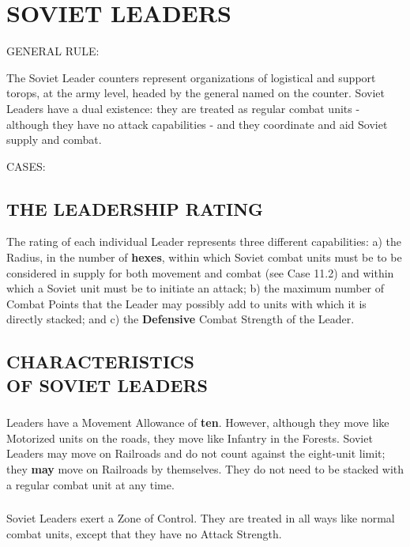\section{SOVIET LEADERS}

GENERAL RULE:

The Soviet Leader counters represent organizations of logistical and support torops, at the army level, headed by the general named on the counter. Soviet Leaders have a dual existence: they are treated as regular combat units - although they have no attack capabilities - and they coordinate and aid Soviet supply and combat.

CASES:

\subsection{THE LEADERSHIP RATING}

The rating of each individual Leader represents three different capabilities: a) the Radius, in the number of \textbf{hexes}, within which Soviet combat units must be to be considered in supply for both movement and combat (see Case 11.2) and within which a Soviet unit must be to initiate an attack; b) the maximum number of Combat Points that the Leader may possibly add to units with which it is directly stacked; and c) the \textbf{Defensive} Combat Strength of the Leader.

\subsection{CHARACTERISTICS\\OF SOVIET LEADERS}

\subsubsection{} Leaders have a Movement Allowance of \textbf{ten}. However, although they move like Motorized units on the roads, they move like Infantry in the Forests. Soviet Leaders may move on Railroads and do not count against the eight-unit limit; they \textbf{may} move on Railroads by themselves. They do not need to be stacked with a regular combat unit at any time.

\subsubsection{} Soviet Leaders exert a Zone of Control. They are treated in all ways like normal combat units, except that they have no Attack Strength.

